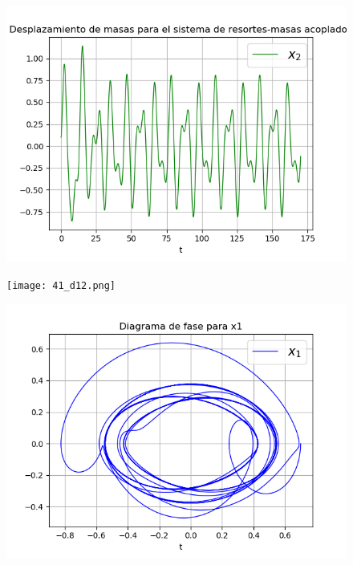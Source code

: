 \documentclass{article}
\begin{document}
\begin{figure}[H]
\centering
\includegraphics[scale=0.59]{41_d2.png}
\end{figure}

\begin{figure}[H]
\centering
\texttt{[image: 41\_d12.png]}
\end{figure}

\begin{figure}[H]
\centering
\includegraphics[scale=0.59]{41_f1.png}
\end{figure}
\end{document}
